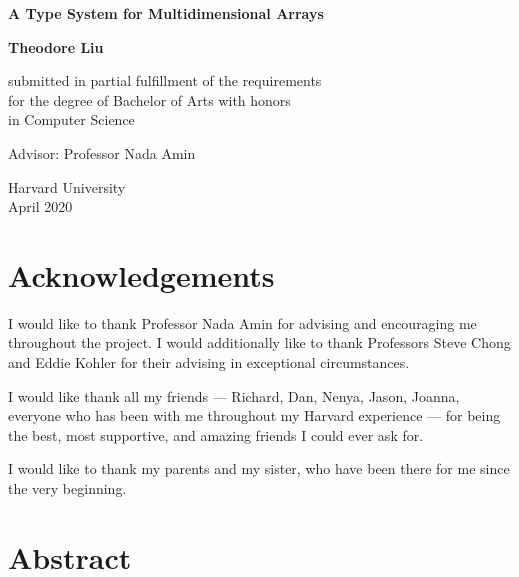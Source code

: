 \documentclass[12pt]{report}
\begin{document}
\begin{titlepage}
   \begin{center}
       \vspace*{1cm}

       \vfill
       {\large\textbf{A Type System for Multidimensional Arrays}}


       \vspace{1.5cm}

       \textbf{Theodore Liu}

       \vspace{1.5cm}

       submitted in partial fulfillment of the requirements \\
       for the degree of Bachelor of Arts with honors \\
       in Computer Science

       \vspace{1.5cm}

       Advisor: Professor Nada Amin

       \vspace{0.8cm}


       Harvard University\\
       April 2020

       \vfill
       \vspace*{1cm}
   \end{center}
\end{titlepage}

\chapter*{Acknowledgements}

I would like to thank Professor Nada Amin for advising and encouraging me throughout the project. I would additionally like to thank Professors Steve Chong and Eddie Kohler for their advising in exceptional circumstances.

I would like thank all my friends --- Richard, Dan, Nenya, Jason, Joanna, everyone who has been with me throughout my Harvard experience --- for being the best, most supportive, and amazing friends I could ever ask for.

I would like to thank my parents and my sister, who have been there for me since the very beginning.

\chapter*{Abstract}
\end{document}
